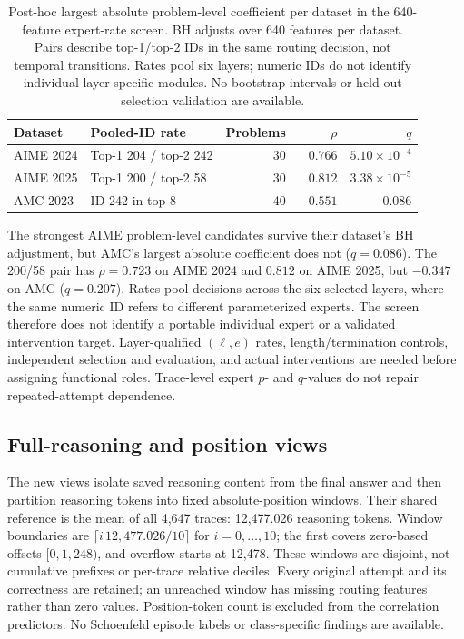 \begin{table}[t]
\centering
\small
\caption{Post-hoc largest absolute problem-level coefficient per dataset in the 640-feature expert-rate screen. BH adjusts over 640 features per dataset. Pairs describe top-1/top-2 IDs in the same routing decision, not temporal transitions. Rates pool six layers; numeric IDs do not identify individual layer-specific modules. No bootstrap intervals or held-out selection validation are available. }
\label{tab:qwen-corr-experts}
\begin{tabular}{@{}llrrr@{}}
\toprule
Dataset & Pooled-ID rate & Problems & $\rho$ & $q$ \\
\midrule
AIME 2024 & Top-1 204 / top-2 242 & 30 & $0.766$ & $5.10\times10^{-4}$ \\
AIME 2025 & Top-1 200 / top-2 58 & 30 & $0.812$ & $3.38\times10^{-5}$ \\
AMC 2023 & ID 242 in top-8 & 40 & $-0.551$ & $0.086$ \\
\bottomrule
\end{tabular}
\end{table}

The strongest AIME problem-level candidates survive their dataset's BH
adjustment, but AMC's largest absolute coefficient does not ($q=0.086$).
The 200/58 pair has $\rho=0.723$ on AIME 2024 and $0.812$ on AIME 2025,
but $-0.347$ on AMC ($q=0.207$). Rates pool decisions across the six
selected layers, where the same numeric ID refers to different parameterized
experts. The screen therefore does not identify a portable individual expert
or a validated intervention target. Layer-qualified $(\ell,e)$ rates,
length/termination controls, independent selection and evaluation, and actual
interventions are needed before assigning functional roles. Trace-level
expert $p$- and $q$-values do not repair repeated-attempt dependence.

\subsection{Full-reasoning and position views}
\label{sec:qwen-corr-views}

The new views isolate saved reasoning content from the final answer and then
partition reasoning tokens into fixed absolute-position windows. Their shared
reference is the mean of all 4,647 traces: 12,477.026 reasoning tokens. Window
boundaries are $\lceil i\,12{,}477.026/10\rceil$ for $i=0,\ldots,10$;
the first covers zero-based offsets $[0,1{,}248)$, and overflow starts at
12,478. These windows are disjoint, not cumulative prefixes or per-trace
relative deciles. Every original attempt and its correctness are retained;
an unreached window has missing routing features rather than zero values.
Position-token count is excluded from the correlation predictors. No
Schoenfeld episode labels or class-specific findings are available.


